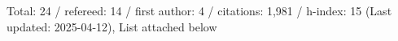 Total: 24 / refereed: 14 / first author: 4 / citations: 1,981 / h-index: 15 (Last updated: 2025-04-12), List attached below